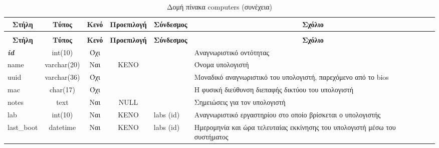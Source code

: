 %
%
\begin{longtable}{|l|c|c|c|l|p{4.5cm}|}
	\caption{Δομή πίνακα computers} \label{tab:computers-structure} \\
	\hline \multicolumn{1}{|c|}{\textbf{Στήλη}} & \multicolumn{1}{|c|}{\textbf{Τύπος}} & \multicolumn{1}{|c|}{\textbf{Κενό}} & \multicolumn{1}{|c|}{\textbf{Προεπιλογή}} & \multicolumn{1}{|c|}{\textbf{Σύνδεσμος}} & \multicolumn{1}{|c|}{\textbf{Σχόλιο}} \\ \hline \hline \endfirsthead
	\caption[{}]{Δομή πίνακα computers (συνέχεια)} \\
	\hline \multicolumn{1}{|c|}{\textbf{Στήλη}} & \multicolumn{1}{|c|}{\textbf{Τύπος}} & \multicolumn{1}{|c|}{\textbf{Κενό}} & \multicolumn{1}{|c|}{\textbf{Προεπιλογή}} & \multicolumn{1}{|c|}{\textbf{Σύνδεσμος}} & \multicolumn{1}{|c|}{\textbf{Σχόλιο}} \\ \hline \hline \endhead \endfoot
	\textbf{\textit{id}} & int(10) & Όχι &  &  & Αναγνωριστικό οντότητας \\ \hline
	name & varchar(20) & Ναι & ΚΕΝΟ &  & Όνομα υπολογιστή \\ \hline
	uuid & varchar(36) & Όχι &  &  & Μοναδικό αναγνωριστικό του υπολογιστή, παρεχόμενο από το bios \\ \hline
	mac & char(17) & Όχι &  &  & Η φυσική διεύθυνση διεπαφής δικτύου του υπολογιστή \\ \hline
	notes & text & Ναι & NULL &  & Σημειώσεις για τον υπολογιστή \\ \hline
	lab & int(10) & Ναι & ΚΕΝΟ & labs (id) & Αναγνωριστικό εργαστηρίου στο οποίο βρίσκεται ο υπολογιστής \\ \hline
	last\_boot & datetime & Ναι & ΚΕΝΟ & labs (id) & Ημερομηνία και ώρα τελευταίας εκκίνησης του υπολογιστή μέσω του συστήματος \\ \hline
\end{longtable}


